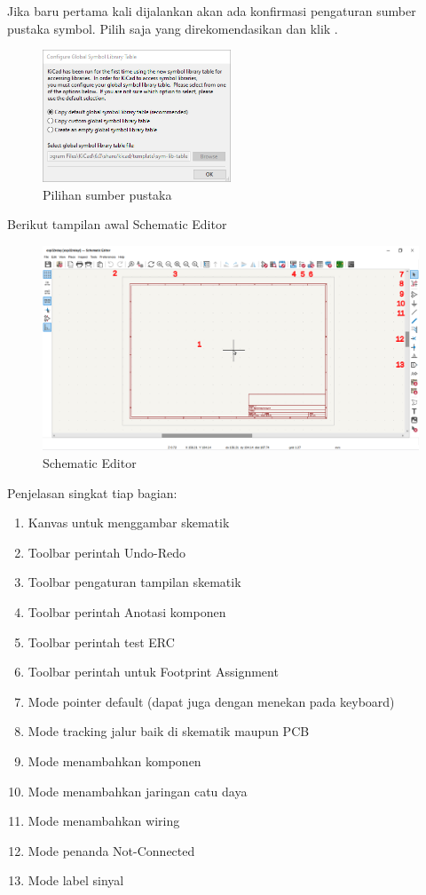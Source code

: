 \documentclass[12pt]{book}
\begin{document}
	Jika baru pertama kali dijalankan akan ada konfirmasi pengaturan sumber pustaka symbol.
	Pilih saja yang direkomendasikan dan klik .

	\begin{figure}[!ht]
		\centering
		\includegraphics[width=0.5\textwidth]{images/installations/kicad_first_sch}
		\caption{Pilihan sumber pustaka}
	\end{figure}

	\newpage
	Berikut tampilan awal Schematic Editor
	\begin{figure}[!ht]
		\centering
		\includegraphics[width=\textwidth]{images/sch/sch_1}
		\caption{Schematic Editor}
	\end{figure}

	Penjelasan singkat tiap bagian:
	\begin{enumerate}[label=\textbf{\arabic*}.]
		\item Kanvas untuk menggambar skematik
		\item Toolbar perintah Undo-Redo
		\item Toolbar pengaturan tampilan skematik
		\item Toolbar perintah Anotasi komponen
		\item Toolbar perintah test ERC
		\item Toolbar perintah untuk Footprint Assignment
		\item Mode pointer default (dapat juga dengan menekan  pada keyboard)
		\item Mode tracking jalur baik di skematik maupun PCB
		\item Mode menambahkan komponen
		\item Mode menambahkan jaringan catu daya
		\item Mode menambahkan wiring
		\item Mode penanda Not-Connected
		\item Mode label sinyal
	\end{enumerate}
\end{document}
